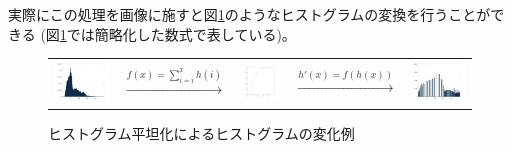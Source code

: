 \documentclass[a4paper,11pt,dvipdfmx]{jsarticle}
\begin{document}
実際にこの処理を画像に施すと図\ref{hist_3}のようなヒストグラムの変換を行うことができる
(図\ref{hist_3}では簡略化した数式で表している)。

\begin{figure}[htbp]
    \centering
    \begin{tabular}{ccccc}
    \begin{minipage}[l]{0.2\hsize}
        \centering
        \includegraphics[width=40mm]{./img/flatten_ex.jpg}
    \end{minipage}&
    \begin{minipage}[c]{0.2\hsize}
        \centering
        \begin{math}
                \overset{f(x) = \sum_{i=i}^{x}h(i)}{\to}
        \end{math}
    \end{minipage}&
    \begin{minipage}[c]{0.21\hsize}
        \centering
        \includegraphics[width=30mm]{./img/flatten_func_ex.jpg}
    \end{minipage}&
    \begin{minipage}{0.12\hsize}
        \centering
        \begin{math}
                \overset{h'(x)=f(h(x))}{\to}
        \end{math}
    \end{minipage}&
    \begin{minipage}[c]{0.2\hsize}
        \centering
        \includegraphics[width=40mm]{./img/flatten_ex2.jpg}
    \end{minipage}
    \end{tabular}
    \caption{ヒストグラム平坦化によるヒストグラムの変化例}
    \label{hist_3}
\end{figure}
\end{document}
